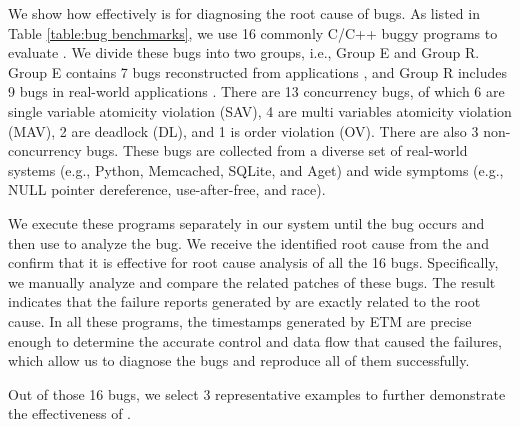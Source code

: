 We show how effectively \TheName is for diagnosing the root cause of bugs. As
listed in Table \ref{table:bug benchmarks}, we use 16 commonly C/C++ buggy
programs
\cite{cui2018rept,kasikci_lazy_2017,yu2009case,yu2012maple,kasikci2015failure, liang2020ript}
to evaluate \TheName.
We divide these bugs into two groups, i.e., Group E and Group R.
Group E contains 7 bugs reconstructed from
applications \cite{yu2009case,yu2012maple}, and Group R includes 9 bugs in
real-world applications
\cite{cui2018rept,kasikci_lazy_2017, kasikci2015failure, liang2020ript}.
There are 13 concurrency bugs, of which 6 are single variable atomicity
violation (SAV), 4 are multi variables atomicity violation (MAV), 2 are deadlock
(DL), and 1 is order violation (OV). There are also 3 non-concurrency bugs.
These bugs are collected from a diverse set of real-world systems (e.g., Python,
Memcached, SQLite, and Aget) and wide symptoms (e.g., NULL pointer dereference,
use-after-free, and race).




We execute these programs separately in our system until the bug occurs
and then use \TheName to analyze the bug. We receive the identified root 
cause from the \TheName and confirm that it is effective for root cause analysis 
of all the 16 bugs. Specifically, we manually analyze and compare the related patches 
of these bugs. The result indicates that the failure reports
generated by \TheName are exactly related to the root cause. In all these programs, 
the timestamps generated by ETM are precise enough to determine the accurate control 
and data flow that caused the failures, which
allow us to diagnose the bugs and reproduce all of them successfully.

Out of those 16 bugs, we select 3 representative
examples to further demonstrate the effectiveness of \TheName.


